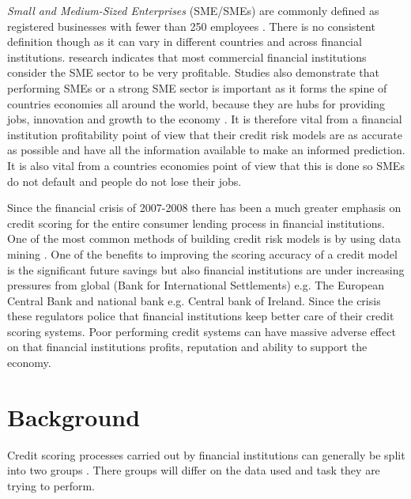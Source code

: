 \textit{Small and Medium-Sized Enterprises} (SME/SMEs) are commonly defined as registered businesses with fewer than 250 employees \citep{ifc_sme_2009}. There is no consistent definition though as it can vary in different countries and across financial institutions. \cite{beck_bank_2008} research indicates that most commercial financial institutions consider the SME sector to be very profitable. Studies also demonstrate that performing SMEs or a strong SME sector is important as it forms the spine of countries economies all around the world, because they are hubs for providing jobs, innovation and growth to the economy \citep{craig_sba-guaranteed_2004}. It is therefore vital from a financial institution profitability point of view that their credit risk models are as accurate as possible and have all the information available to make an informed prediction. It is also vital from a countries economies point of view that this is done so SMEs do not default and people do not lose their jobs. 


Since the financial crisis of 2007-2008 there has been a much greater emphasis on credit scoring for the entire consumer lending process in financial institutions. One of the most common methods of building credit risk models is by using data mining \citep{baesens_50_2009}. One of the benefits to improving the scoring accuracy of a credit model is the significant future savings \citep{west_neural_2000} but also financial institutions are under increasing pressures from global (Bank for International Settlements) e.g. The European Central Bank and national bank e.g. Central bank of Ireland. Since the crisis these regulators police that financial institutions keep better care of their credit scoring systems. Poor performing credit systems can have massive adverse effect on that financial institutions profits, reputation and ability to support the economy.


\section{Background}

Credit scoring processes carried out by financial institutions can generally be split into two groups \citep{bijak_does_2012}. There groups will differ on the data used and task they are trying to perform. 

